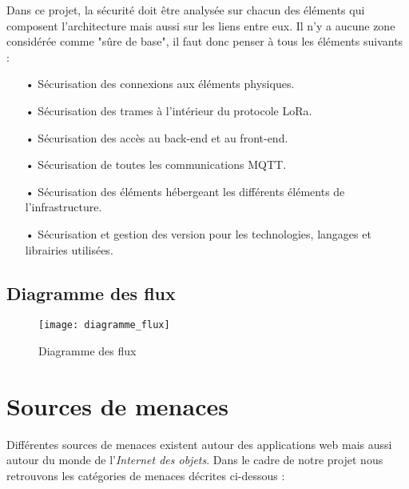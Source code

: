 Dans ce projet, la sécurité doit être analysée sur chacun des éléments qui composent l'architecture mais aussi sur les liens entre eux. Il n'y a aucune zone considérée comme "sûre de base", il faut donc penser à tous les éléments suivants :

\begin{itemize}
\item[•] Sécurisation des connexions aux éléments physiques.
\item[•] Sécurisation des trames à l'intérieur du protocole LoRa.
\item[•] Sécurisation des accès au back-end et au front-end.
\item[•] Sécurisation de toutes les communications MQTT.
\item[•] Sécurisation des éléments hébergeant les différents éléments de l'infrastructure.
\item[•] Sécurisation et gestion des version pour les technologies, langages et librairies utilisées.
\end{itemize}
\clearpage

\subsection{Diagramme des flux}
\label{ssec:diagramme}

\begin{figure}[h!]
\centering
\texttt{[image: diagramme\_flux]}
\caption{Diagramme des flux}
\end{figure}

\section{Sources de menaces}

Différentes sources de menaces existent autour des applications web mais aussi autour du monde de l'\emph{Internet des objets}. Dans le cadre de notre projet nous retrouvons les catégories de menaces décrites ci-dessous :

